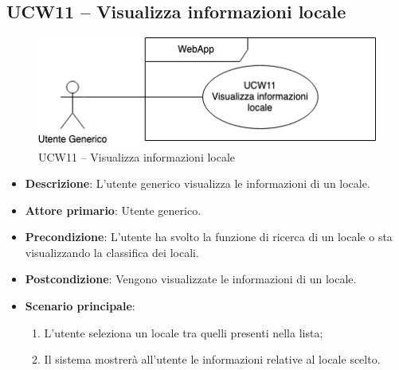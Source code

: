 \subsection{UCW11 – Visualizza informazioni locale}
\begin{figure}[!h]
\centering
\includegraphics[scale=0.5]{UC_images/UCW11.png} 
\caption{UCW11 – Visualizza informazioni locale}
\end{figure}
\begin{itemize}
    \item \textbf{Descrizione}: L'utente generico visualizza le informazioni di un locale.
    \item \textbf{Attore primario}: Utente generico.
    \item \textbf{Precondizione}: L'utente ha svolto la funzione di ricerca di un locale o sta visualizzando la classifica dei locali.
    \item \textbf{Postcondizione}: Vengono visualizzate le informazioni di un locale.    
    \item \textbf{Scenario principale}: 
    \begin{enumerate}
    \item L'utente seleziona un locale tra quelli presenti nella lista;
    \item Il sistema mostrerà all'utente le informazioni relative al locale scelto.
    \end{enumerate}
\end{itemize}
